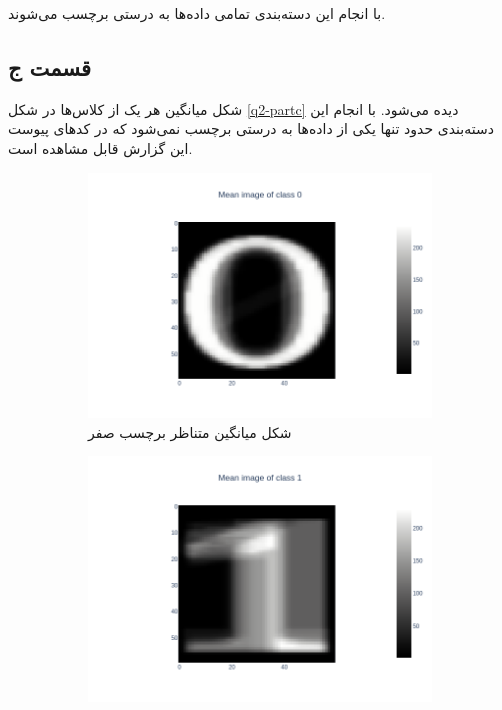 \documentclass{article}
\begin{document}
با انجام این دسته‌بندی تمامی داده‌ها به درستی برچسب می‌شوند.

\subsection*{قسمت ج}

شکل میانگین هر یک از کلاس‌ها در شکل \ref{q2-partc} دیده می‌شود. با انجام این دسته‌بندی حدود
تنها یکی از داده‌ها به درستی برچسب نمی‌شود که در کد‌های پیوست این گزارش قابل مشاهده است.

\begin{figure}[h]
    \begin{subfigure}{.48\linewidth}
        \centering
        \includegraphics[width=\linewidth]{images/q2/partc/0_prototype.png}
        \caption{شکل میانگین متناظر برچسب صفر}
    \end{subfigure}
    \hfill
    \begin{subfigure}{.48\linewidth}
        \centering
        \includegraphics[width=\linewidth]{images/q2/partc/1_prototype.png}

\end{subfigure}
\end{figure}
\end{document}
